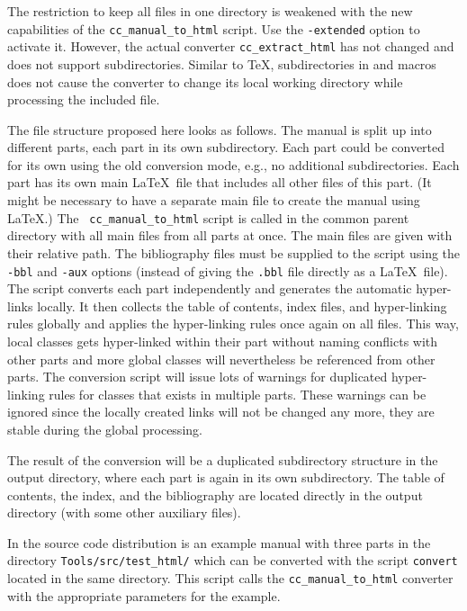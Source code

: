 \documentclass[12pt]{article}
\begin{document}

The restriction to keep all files in one directory is weakened with
the new capabilities of the {\tt cc\_manual\_to\_html} script. Use the
{\tt -extended} option to activate it. However, the actual converter
{\tt cc\_extract\_html} has not changed and does not support
subdirectories. Similar to \TeX, subdirectories in \verb++ and
\verb++ macros does not cause the converter to change its
local working directory while processing the included file.

The file structure proposed here looks as follows. The manual is split
up into different parts, each part in its own subdirectory. Each part
could be converted for its own using the old conversion mode, e.g., no
additional subdirectories. Each part has its own main \LaTeX\ file
that includes all other files of this part. (It might be necessary to
have a separate main file to create the manual using \LaTeX.) The {\tt
  cc\_manual\_to\_html} script is called in the common parent
directory with all main files from all parts at once. The main files
are given with their relative path. The bibliography files must be
supplied to the script using the {\tt -bbl} and {\tt -aux} options
(instead of giving the {\tt *.bbl} file directly as a \LaTeX\ file).
The script converts each part independently and generates the
automatic hyper-links locally. It then collects the table of contents,
index files, and hyper-linking rules globally and applies the
hyper-linking rules once again on all files. This way, local classes
gets hyper-linked within their part without naming conflicts with other
parts and more global classes will nevertheless be referenced from
other parts. The conversion script will issue lots of warnings for
duplicated hyper-linking rules for classes that exists in multiple
parts. These warnings can be ignored since the locally created links
will not be changed any more, they are stable during the global
processing.

The result of the conversion will be a duplicated subdirectory
structure in the output directory, where each part is again in its own
subdirectory. The table of contents, the index, and the bibliography
are located directly in the output directory (with some other
auxiliary files).

In the source code distribution is an example manual with three parts
in the directory {\tt Tools/src/test\_html/} which can be converted
with the script {\tt convert} located in the same directory. This
script calls the {\tt cc\_manual\_to\_html} converter with the
appropriate parameters for the example.
\end{document}
